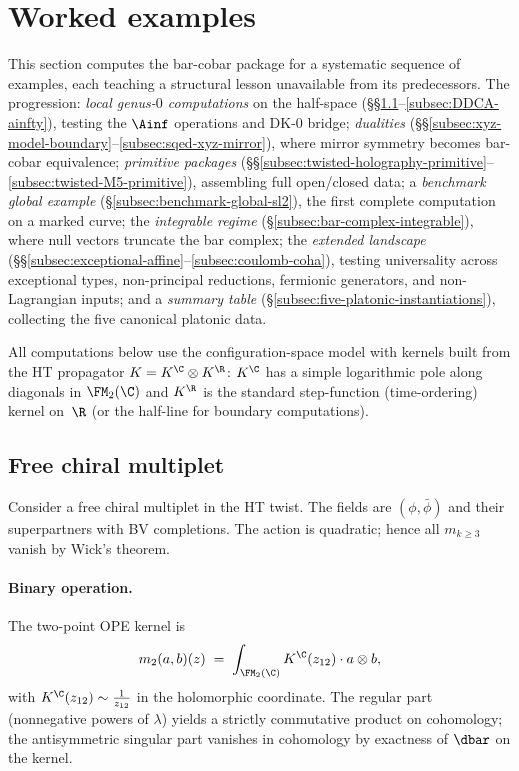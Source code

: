 \section{Worked examples}
\label{sec:examples_worked}

This section computes the bar-cobar package for a systematic sequence
of examples, each teaching a structural lesson unavailable from its predecessors. The progression:
\emph{local genus-$0$ computations} on the half-space
(\S\S\ref{subsec:free-chiral}--\ref{subsec:DDCA-ainfty}), testing the
$\Ainf$ operations and DK-0 bridge; \emph{dualities}
(\S\S\ref{subsec:xyz-model-boundary}--\ref{subsec:sqed-xyz-mirror}),
where mirror symmetry becomes bar-cobar equivalence; \emph{primitive
packages} (\S\S\ref{subsec:twisted-holography-primitive}--\ref{subsec:twisted-M5-primitive}),
assembling full open/closed data; a \emph{benchmark global example}
(\S\ref{subsec:benchmark-global-sl2}), the first complete computation
on a marked curve; the \emph{integrable regime}
(\S\ref{subsec:bar-complex-integrable}), where null vectors truncate the
bar complex; the \emph{extended landscape}
(\S\S\ref{subsec:exceptional-affine}--\ref{subsec:coulomb-coha}),
testing universality across exceptional types, non-principal reductions,
fermionic generators, and non-Lagrangian inputs; and a
\emph{summary table} (\S\ref{subsec:five-platonic-instantiations}),
collecting the five canonical platonic data.

All computations below use the configuration-space model with kernels built from the HT propagator $K=K^{\C}\otimes K^{\R}$:
$K^{\C}$ has a simple logarithmic pole along diagonals in $\FM_2(\C)$ and $K^{\R}$ is the standard step-function (time-ordering) kernel on~$\R$ (or the half-line for boundary computations).

\subsection{Free chiral multiplet}
\label{subsec:free-chiral}
Consider a free chiral multiplet in the HT twist. The fields are $(\phi,\bar\phi)$ and their superpartners with BV completions. The action is quadratic; hence all $m_{k\ge3}$ vanish by Wick's theorem.

\paragraph{Binary operation.}
The two-point OPE kernel is
\[
m_2(a,b)(z) \;=\; \int_{\FM_2(\C)} K^{\C}(z_{12})\cdot a\otimes b,
\]
with $K^{\C}(z_{12})\sim \frac{1}{z_{12}}$ in the holomorphic coordinate. The regular part (nonnegative powers of $\lambda$) yields a strictly commutative product on cohomology; the antisymmetric singular part vanishes in cohomology by exactness of $\dbar$ on the kernel.

